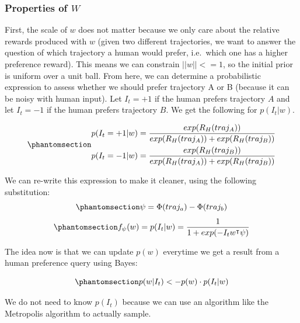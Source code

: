 \documentclass[
  letterpaper,
  numbers=noenddot,
  DIV=11]{scrreprt}
\theoremstyle{plain}
\theoremstyle{definition}
\theoremstyle{plain}
\theoremstyle{remark}
\begin{document}
\subsubsection*{\texorpdfstring{Properties of
\(W\)}{Properties of W}}\label{properties-of-w}

First, the scale of \(w\) does not matter because we only care about the
relative rewards produced with \(w\) (given two different trajectories,
we want to answer the question of which trajectory a human would prefer,
i.e.~which one has a higher preference reward). This means we can
constrain \(||w|| <= 1\), so the initial prior is uniform over a unit
ball. From here, we can determine a probabilistic expression to assess
whether we should prefer trajectory A or B (because it can be noisy with
human input). Let \(I_t = +1\) if the human prefers trajectory \(A\) and
let \(I_t = -1\) if the human prefers trajectory \(B\). We get the
following for \(p(I_t | w)\).

\begin{equation}\phantomsection\label{eq-eq3.37}{\begin{aligned}
p(I_t = +1|w) &= \frac{exp(R_H(traj_A))}{exp(R_H(traj_A)) + exp(R_H(traj_B))}\\
p(I_t = -1|w) &= \frac{exp(R_H(traj_B))}{exp(R_H(traj_A)) + exp(R_H(traj_B))}
\end{aligned}}\end{equation}

We can re-write this expression to make it cleaner, using the following
substitution:
\begin{equation}\phantomsection\label{eq-eq3.38}{\psi = \Phi(traj_a) - \Phi(traj_b)}\end{equation}
\begin{equation}\phantomsection\label{eq-eq3.39}{f_{\psi} (w) = p(I_t|w) = \frac{1}{1 + exp(-I_tw^{\intercal}\psi)}}\end{equation}

The idea now is that we can update \(p(w)\) everytime we get a result
from a human preference query using Bayes:

\begin{equation}\phantomsection\label{eq-eq3.40}{p(w|I_t) <- p(w) \cdot p(I_t|w)}\end{equation}

We do not need to know \(p(I_t)\) because we can use an algorithm like
the Metropolis algorithm to actually sample.
\end{document}
